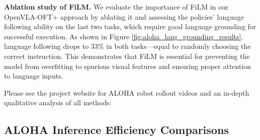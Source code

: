 \documentclass[conference]{IEEEtran}
\begin{document}
\textbf{Ablation study of FiLM.} We evaluate the importance of FiLM in our OpenVLA-OFT+ approach by ablating it and assessing the policies' language following ability on the last two tasks, which require good language grounding for successful execution. As shown in Figure \ref{fig:aloha_lang_grounding_results}, language following drops to 33\% in both tasks---equal to randomly choosing the correct instruction. This demonstrates that FiLM is essential for preventing the model from overfitting to spurious visual features and ensuring proper attention to language inputs.

Please see the project website for ALOHA robot rollout videos and an in-depth qualitative analysis of all methods: \website










\begin{table}
\caption{\textbf{ALOHA robot inference efficiency results.} Throughput and latency measurements averaged over 100 queries on an NVIDIA A100 GPU. Each query processes three 224 × 224 px images, 14-D robot state, and a task command (``scoop raisins into bowl''). All methods use action chunk size K=25, except Diffusion Policy (K=24, as a multiple of 4 is required) and the original OpenVLA (K=1, no chunking). RDT-1B predicts 64 actions, but we execute the first 25 only for fair comparison. All implementations use PyTorch except $\pi_0$ (JAX). Bold and underlined values show best and second-best performance.}
\label{tab:aloha_efficiency_results}
\end{table}

\subsection{ALOHA Inference Efficiency Comparisons}
\end{document}
